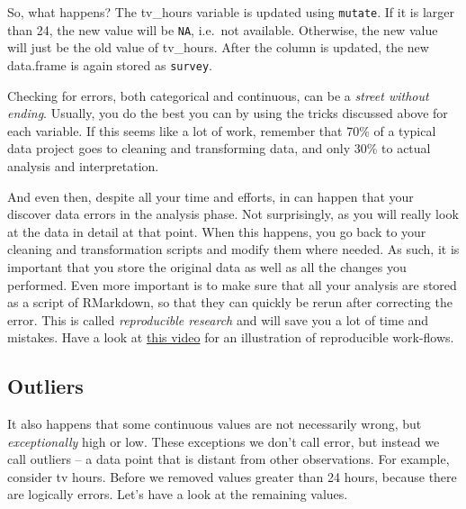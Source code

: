 \documentclass[]{tufte-book}
\newenvironment{Shaded}{}{}
\newcommand{\DataTypeTok}[1]{\textcolor[rgb]{0.56,0.13,0.00}{#1}}
\newcommand{\DecValTok}[1]{\textcolor[rgb]{0.25,0.63,0.44}{#1}}
\newcommand{\KeywordTok}[1]{\textcolor[rgb]{0.00,0.44,0.13}{\textbf{#1}}}
\newcommand{\NormalTok}[1]{#1}
\newcommand{\OperatorTok}[1]{\textcolor[rgb]{0.40,0.40,0.40}{#1}}
\newcommand{\StringTok}[1]{\textcolor[rgb]{0.25,0.44,0.63}{#1}}
\begin{document}
So, what happens? The tv\_hours variable is updated using \texttt{mutate}. If it is larger than 24, the new value will be \texttt{NA}, i.e.~not available. Otherwise, the new value will just be the old value of tv\_hours. After the column is updated, the new data.frame is again stored as \texttt{survey}.

Checking for errors, both categorical and continuous, can be a \emph{street without ending}. Usually, you do the best you can by using the tricks discussed above for each variable. If this seems like a lot of work, remember that 70\% of a typical data project goes to cleaning and transforming data, and only 30\% to actual analysis and interpretation.

And even then, despite all your time and efforts, in can happen that your discover data errors in the analysis phase. Not surprisingly, as you will really look at the data in detail at that point. When this happens, you go back to your cleaning and transformation scripts and modify them where needed. As such, it is important that you store the original data as well as all the changes you performed. Even more important is to make sure that all your analysis are stored as a script of RMarkdown, so that they can quickly be rerun after correcting the error. This is called \emph{reproducible research} and will save you a lot of time and mistakes. Have a look at \href{https://www.youtube.com/watch?v=s3JldKoA0zw}{this video} for an illustration of reproducible work-flows.

\hypertarget{outliers}{%
\subsection{Outliers}\label{outliers}}

It also happens that some continuous values are not necessarily wrong, but \emph{exceptionally} high or low. These exceptions we don't call error, but instead we call outliers -- a data point that is distant from other observations. For example, consider tv hours. Before we removed values greater than 24 hours, because there are logically errors. Let's have a look at the remaining values.

\begin{Shaded}
\end{Shaded}
\end{document}
